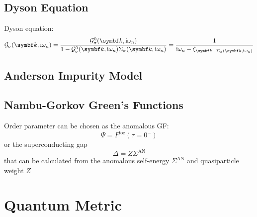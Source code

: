 \documentclass[../notes.tex]{subfiles}
\begin{document}


\subsection*{Dyson Equation}


Dyson equation:
\begin{equation}
	\mathcal{G}_{\sigma} (\vb{k}, \iu \omega_n) = \frac{\mathcal{G}_{\sigma}^0 (\vb{k}, \iu \omega_n)}{1 - \mathcal{G}_{\sigma}^0 (\vb{k}, \iu \omega_n) \Sigma_{\sigma} (\vb{k}, \iu \omega_n)} = \frac{1}{\iu \omega_n - \xi_{\vb{k} - \Sigma_{\sigma} (\vb{k}, \iu \omega_n)}}
\end{equation}


\subsection*{Anderson Impurity Model}

\subsection*{Nambu-Gorkov Green's Functions}


Order parameter can be chosen as the anomalous GF:
\begin{equation}
	\Psi = F^{\mathrm{loc}} (\tau = 0^-)
\end{equation}
or the superconducting gap
\begin{equation}
	\Delta = Z \Sigma^{\mathrm{AN}}
\end{equation}
that can be calculated from the anomalous self-energy \(\Sigma^{\mathrm{AN}}\) and quasiparticle weight \(Z\)


\section{Quantum Metric}\label{sec:quantum-metric}
\end{document}
